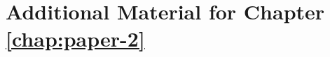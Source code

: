 \setchapterpreamble[u]{\margintoc}
\chapter{Additional Material for Chapter \ref{chap:paper-2}}



\backmatter%





